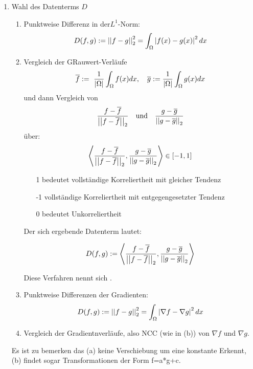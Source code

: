 \begin{enumerate}
    \item Wahl des Datenterms $D$
    \begin{enumerate}
        \item Punktweise Differenz in der$L^1$-Norm:
            \[D(f,g) := \left\lvert \left\lvert f-g \right\rvert \right\rvert_2^2 = \int_\Omega \left\lvert f(x)-g(x) \right\rvert^2 dx\]
        \item Vergleich der GRauwert-Verläufe
            \[\overline{f} :=\ \frac{1}{\left\lvert \Omega \right\rvert} \int_\Omega f(x) dx, \quad \overline{g} := \frac{1}{\left\lvert \Omega \right\rvert} \int_\Omega g(x) dx\]
            und dann Vergleich von
            \[\frac{f - \overline{f}}{\left\lvert \left\lvert f-\overline{f} \right\rvert \right\rvert_2} \quad \text{und} \quad \frac{g - \overline{g}}{\left\lvert \left\lvert g-\overline{g} \right\rvert \right\rvert_2}\]
            über:
            \[\left \langle \frac{f - \overline{f}}{\left\lvert \left\lvert f-\overline{f} \right\rvert \right\rvert_2},\frac{g - \overline{g}}{\left\lvert \left\lvert g-\overline{g} \right\rvert \right\rvert_2} \right \rangle \in [-1,1]\]

            \begin{enumerate}
                \item[1] bedeutet vollständige Korreliertheit mit gleicher Tendenz
                \item[-1] vollständige Korreliertheit mit entgegengesetzter Tendenz
                \item[0] bedeutet Unkorreliertheit
            \end{enumerate}

            Der sich ergebende Datenterm lautet:

            \[D(f,g) := \left \langle \frac{f - \overline{f}}{\left\lvert \left\lvert f-\overline{f} \right\rvert \right\rvert_2},\frac{g - \overline{g}}{\left\lvert \left\lvert g-\overline{g} \right\rvert \right\rvert_2} \right \rangle\]

            Diese Verfahren nennt sich .
            \item Punktweise Differenzen der Gradienten:
                \[D(f,g) := \left\lvert \left\lvert f-g \right\rvert \right\rvert_2^2 = \int_\Omega \left\lvert \nabla f - \nabla g \right\rvert^2 dx\]

            \item Vergleich der Gradientnverläufe, also NCC (wie in (b)) von $\nabla f$ und $\nabla g$.
    \end{enumerate}
    Es ist zu bemerken das (a) keine Verschiebung um eine konstante Erkennt, (b) findet sogar Transformationen der Form f=a*g+c.


\end{enumerate}
